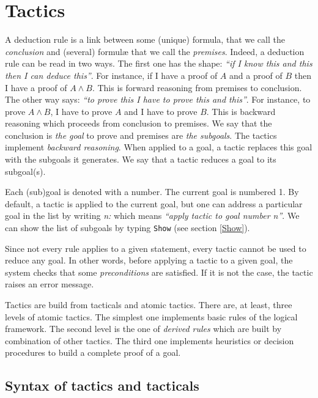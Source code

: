 \chapter{Tactics}
\label{Tactics}

A deduction rule is a link between some (unique) formula, that we call
the {\em conclusion} and (several) formul{\ae} that we call the {\em
premises}. Indeed, a deduction rule can be read in two ways. The first
one has the shape: {\it ``if I know this and this then I can deduce
this''}. For instance, if I have a proof of $A$ and a proof of $B$
then I have a proof of $A \land B$. This is forward reasoning from
premises to conclusion. The other way says: {\it ``to prove this I
have to prove this and this''}. For instance, to prove $A \land B$, I
have to prove $A$ and I have to prove $B$. This is backward reasoning
which proceeds from conclusion to premises. We say that the conclusion
is {\em the goal} to prove and premises are {\em the
subgoals}.  The tactics implement {\em backward
reasoning}. When applied to a goal, a tactic replaces this goal with
the subgoals it generates. We say that a tactic reduces a goal to its
subgoal(s).

Each (sub)goal is denoted with a number. The current goal is numbered
1. By default, a tactic is applied to the current goal, but one can
address a particular goal in the list by writing {\sl n:\tac} which
means {\it ``apply tactic {\tac} to goal number {\sl n}''}.
We can show the list of subgoals by typing {\tt Show} (see section
\ref{Show}).

Since not every rule applies to a given statement, every tactic cannot be
used to reduce any goal. In other words, before applying a tactic to a
given goal, the system checks that some {\em preconditions} are
satisfied. If it is not the case, the tactic raises an error message.

Tactics are build from tacticals and atomic tactics.  There are, at
least, three levels of atomic tactics. The simplest one implements
basic rules of the logical framework. The second level is the one of
{\em derived rules} which are built by combination of other
tactics. The third one implements heuristics or decision procedures to
build a complete proof of a goal.  

\section{Syntax of tactics and tacticals}
\label{tactic-syntax}

